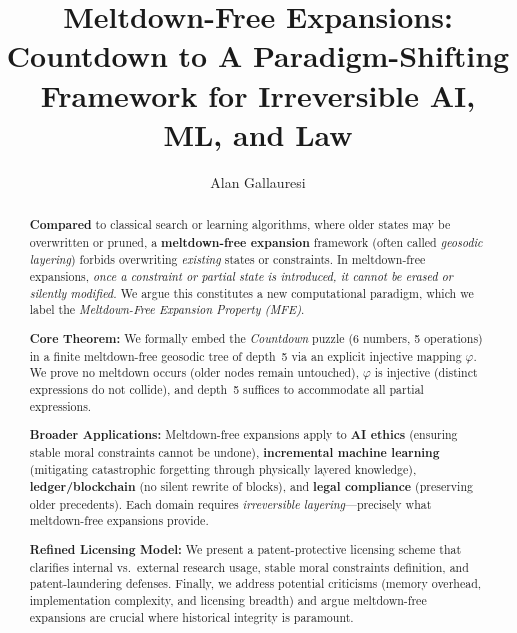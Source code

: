 \documentclass[acmsmall]{acmart}
\theoremstyle{definition}
\theoremstyle{remark}
\begin{document}
\title{Meltdown-Free Expansions:\\ Countdown to A Paradigm-Shifting Framework for Irreversible AI, ML, and Law}

\author{Alan Gallauresi}

\begin{abstract}
\textbf{Compared} to classical search or learning algorithms, where older states
may be overwritten or pruned, a \textbf{meltdown-free expansion} framework
(often called \emph{geosodic layering}) forbids overwriting \emph{existing}
states or constraints. In meltdown-free expansions, \emph{once a constraint or
partial state is introduced, it cannot be erased or silently modified.} We
argue this constitutes a new computational paradigm, which we label the
\emph{Meltdown-Free Expansion Property (MFE)}.

\textbf{Core Theorem:} We formally embed the \emph{Countdown} puzzle (6 numbers,
5 operations) in a finite meltdown-free geosodic tree of depth~5 via an explicit
injective mapping \(\varphi\). We prove no meltdown occurs (older nodes remain
untouched), \(\varphi\) is injective (distinct expressions do not collide), and
depth~5 suffices to accommodate all partial expressions.

\textbf{Broader Applications:} Meltdown-free expansions apply to \textbf{AI ethics}
(ensuring stable moral constraints cannot be undone), \textbf{incremental machine learning}
(mitigating catastrophic forgetting through physically layered knowledge),
\textbf{ledger/blockchain} (no silent rewrite of blocks), and \textbf{legal compliance}
(preserving older precedents). Each domain requires \emph{irreversible layering}—precisely
what meltdown-free expansions provide.

\textbf{Refined Licensing Model:} We present a patent-protective licensing scheme
that clarifies internal vs.\ external research usage, stable moral constraints definition,
and patent-laundering defenses. Finally, we address potential criticisms (memory overhead,
implementation complexity, and licensing breadth) and argue meltdown-free expansions
are crucial where historical integrity is paramount.
\end{abstract}

\maketitle
\end{document}
